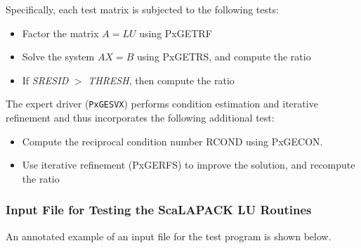 \documentclass[11pt]{report}
\newcommand{\dent}{\hspace*{\parindent}}
\begin{document}
Specifically, each test matrix is subjected to the following tests:

\begin{itemize}
\item Factor the matrix $A = LU$ using PxGETRF
\item Solve the system $A X = B$ using PxGETRS, and compute the ratio
\item If  {\sl SRESID} $>$ {\sl THRESH}, then compute the ratio
\end{itemize}

The expert driver ({\tt PxGESVX}) performs condition estimation and 
iterative refinement and thus incorporates the following additional
test:

\begin{itemize}
\item
Compute the reciprocal condition number RCOND using PxGECON.
\item
Use iterative refinement (PxGERFS) to improve the solution,
and recompute the ratio
\end{itemize}

\subsubsection{Input File for Testing the ScaLAPACK LU Routines}
\dent
An annotated example of an input file for the
test program is shown below.
\end{document}
